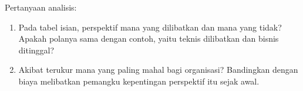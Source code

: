 Pertanyaan analisis:
\begin{enumerate}
  \item Pada tabel isian, perspektif mana yang dilibatkan dan mana yang tidak? Apakah
        polanya sama dengan contoh, yaitu teknis dilibatkan dan bisnis ditinggal?
  \item Akibat terukur mana yang paling mahal bagi organisasi? Bandingkan dengan biaya
        melibatkan pemangku kepentingan perspektif itu sejak awal.
\end{enumerate}
